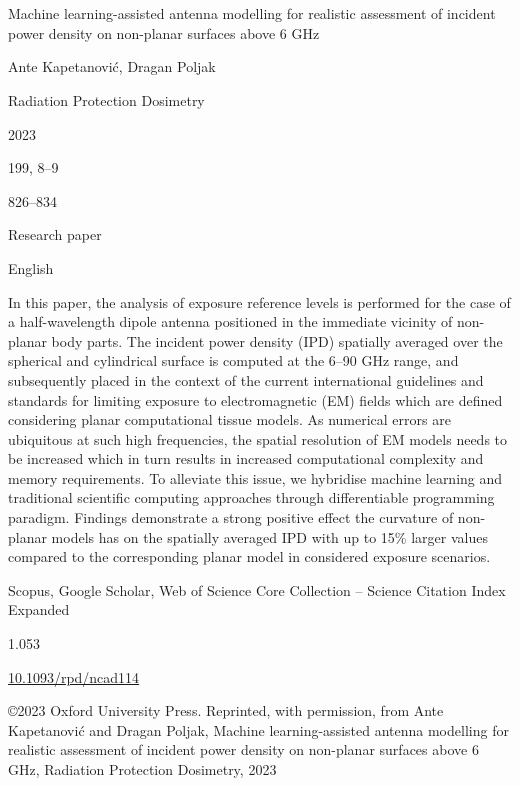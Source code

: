 \cleardoublepage

\chapter{}
\label{chap:b}

\begin{description}[leftmargin=!,labelwidth=\widthof{\bfseries Volume and number}]
    \item[Title] Machine learning-assisted antenna modelling for realistic assessment of incident power density on non-planar surfaces above 6 GHz
    \item[Authors] Ante Kapetanović, Dragan Poljak
    \item[Journal] Radiation Protection Dosimetry
    \item[Year] 2023
    \item[Volume and number] 199, 8--9
    \item[Pages] 826--834
    \item[Categorization] Research paper
    \item[Language] English
    \item[Abstract] In this paper, the analysis of exposure reference levels is performed for the case of a half-wavelength dipole antenna positioned in the immediate vicinity of non-planar body parts.
    The incident power density (IPD) spatially averaged over the spherical and cylindrical surface is computed at the 6–90 GHz range, and subsequently placed in the context of the current international guidelines and standards for limiting exposure to electromagnetic (EM) ﬁelds which are deﬁned considering planar computational tissue models.
    As numerical errors are ubiquitous at such high frequencies, the spatial resolution of EM models needs to be increased which in turn results in increased computational complexity and memory requirements.
    To alleviate this issue, we hybridise machine learning and traditional scientiﬁc computing approaches through differentiable programming paradigm.
    Findings demonstrate a strong positive effect the curvature of non-planar models has on the spatially averaged IPD with up to 15\% larger values compared to the corresponding planar model in considered exposure scenarios.
    \item[Databases] Scopus, Google Scholar, Web of Science Core Collection -- Science Citation Index Expanded
    \item[Impact factor] 1.053
    \item[DOI] \href{https://doi.org/10.1093/rpd/ncad114}{\url{10.1093/rpd/ncad114}}
    \item[Copyright notice] \copyright 2023 Oxford University Press. Reprinted, with permission, from Ante Kapetanović and Dragan Poljak, Machine learning-assisted antenna modelling for realistic assessment of incident power density on non-planar surfaces above 6 GHz, Radiation Protection Dosimetry, 2023
\end{description}

\cleardoublepage


